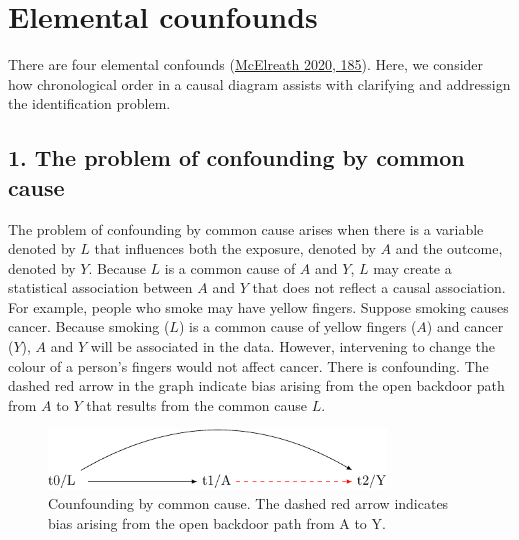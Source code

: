 \documentclass[
  singlecolumn]{report}
\begin{document}
\hypertarget{elemental-counfounds}{%
\section{Elemental counfounds}\label{elemental-counfounds}}

There are four elemental confounds
(\protect\hyperlink{ref-mcelreath2020}{McElreath 2020, 185}). Here, we
consider how chronological order in a causal diagram assists with
clarifying and addressign the identification problem.

\hypertarget{the-problem-of-confounding-by-common-cause}{%
\subsection{1. The problem of confounding by common
cause}\label{the-problem-of-confounding-by-common-cause}}

The problem of confounding by common cause arises when there is a
variable denoted by \(L\) that influences both the exposure, denoted by
\(A\) and the outcome, denoted by \(Y.\) Because \(L\) is a common cause
of \(A\) and \(Y\), \(L\) may create a statistical association between
\(A\) and \(Y\) that does not reflect a causal association. For example,
people who smoke may have yellow fingers. Suppose smoking causes cancer.
Because smoking (\(L\)) is a common cause of yellow fingers (\(A\)) and
cancer (\(Y\)), \(A\) and \(Y\) will be associated in the data. However,
intervening to change the colour of a person's fingers would not affect
cancer. There is confounding. The dashed red arrow in the graph indicate
bias arising from the open backdoor path from \(A\) to \(Y\) that
results from the common cause \(L\).

\begin{figure}

{\centering \includegraphics[width=0.8\textwidth,height=\textheight]{causal-dags_files/figure-pdf/fig-dag-common-cause-1.pdf}

}

\caption{\label{fig-dag-common-cause}Counfounding by common cause. The
dashed red arrow indicates bias arising from the open backdoor path from
A to Y.}

\end{figure}
\end{document}
